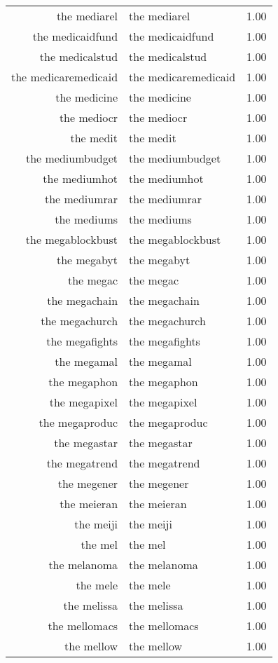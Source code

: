 \begin{table}[ht]
\begin{tabular}{rlr}
  the mediarel & the mediarel & 1.00 \\ 
  the medicaidfund & the medicaidfund & 1.00 \\ 
  the medicalstud & the medicalstud & 1.00 \\ 
  the medicaremedicaid & the medicaremedicaid & 1.00 \\ 
  the medicine & the medicine & 1.00 \\ 
  the mediocr & the mediocr & 1.00 \\ 
  the medit & the medit & 1.00 \\ 
  the mediumbudget & the mediumbudget & 1.00 \\ 
  the mediumhot & the mediumhot & 1.00 \\ 
  the mediumrar & the mediumrar & 1.00 \\ 
  the mediums & the mediums & 1.00 \\ 
  the megablockbust & the megablockbust & 1.00 \\ 
  the megabyt & the megabyt & 1.00 \\ 
  the megac & the megac & 1.00 \\ 
  the megachain & the megachain & 1.00 \\ 
  the megachurch & the megachurch & 1.00 \\ 
  the megafights & the megafights & 1.00 \\ 
  the megamal & the megamal & 1.00 \\ 
  the megaphon & the megaphon & 1.00 \\ 
  the megapixel & the megapixel & 1.00 \\ 
  the megaproduc & the megaproduc & 1.00 \\ 
  the megastar & the megastar & 1.00 \\ 
  the megatrend & the megatrend & 1.00 \\ 
  the megener & the megener & 1.00 \\ 
  the meieran & the meieran & 1.00 \\ 
  the meiji & the meiji & 1.00 \\ 
  the mel & the mel & 1.00 \\ 
  the melanoma & the melanoma & 1.00 \\ 
  the mele & the mele & 1.00 \\ 
  the melissa & the melissa & 1.00 \\ 
  the mellomacs & the mellomacs & 1.00 \\ 
  the mellow & the mellow & 1.00 \\ 

\end{tabular}
\end{table}

